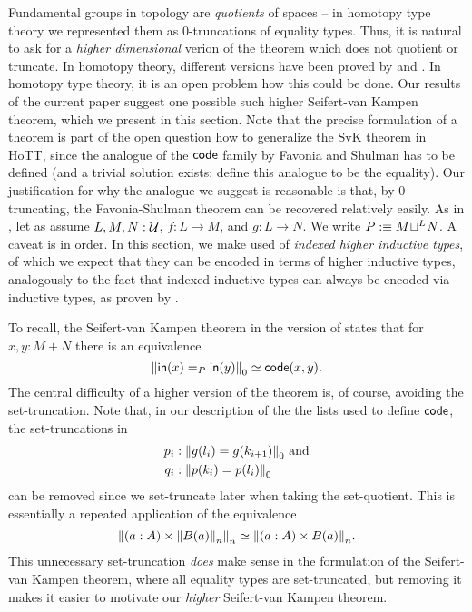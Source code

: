 Fundamental groups in topology are \emph{quotients} of spaces --
in homotopy type theory we represented them as 0-truncations of equality types.
Thus, it is natural to ask for a \emph{higher dimensional} verion of the theorem
which does not quotient or truncate.
In homotopy theory, different versions have been proved by \cite{lurie18derived}
and \cite{brown2011nonabelian}.
In homotopy type theory, it is an open problem how this could be done.
Our results of the current paper suggest one possible such higher Seifert-van Kampen theorem,
which we present in this section.
Note that the precise formulation of a theorem is part of the open question how
to generalize the SvK theorem in HoTT,
since the analogue of the $\code$ family by Favonia and Shulman has to be defined
(and a trivial solution exists: define this analogue to be the equality).
Our justification for why the analogue we suggest is reasonable is that, by
$0$-truncating, the Favonia-Shulman theorem can be recovered relatively easily.
As in , let as assume $L, M, N : \UU$,
$f : L \to M$, and $g : L \to N$. We write $P :\equiv \pout{L}{M}{N}$.
A caveat is in order.
In this section, we make used of \emph{indexed higher inductive types},
of which we expect that they can be encoded in terms of higher inductive types,
analogously to the fact that indexed inductive types can always be encoded via
inductive types, as proven by \cite{DBLP:journals/jfp/AltenkirchGHMM15,Sattler:indexedW}.

To recall, the Seifert-van Kampen theorem in the version of
\cite{favonia:SvK} states that for $x, y : M + N$ there is an equivalence
\begin{equation*}
\trunc{0}{\inp(x) =_P \inp(y)} \simeq \code(x,y) \text{.}
\end{equation*}
The central difficulty of a higher version of the theorem is, of course,
avoiding the set-truncation.
Note that, in our description of the the lists used to define $\code$,
the set-truncations in 
\begin{align*}
p_i &: \trunc 0 {g(l_i) = g(k_{i+1})} \text{ and} \\
q_i &: \trunc 0 {p(k_i) = p(l_i)}
\end{align*}
can be removed since we set-truncate later
when taking the set-quotient.
This is essentially a repeated application of the equivalence
\begin{equation*}
 \trunc{n}{(a:A) \times \trunc{n}{B(a)}} \simeq \trunc{n}{(a:A) \times B(a)}.
\end{equation*}
This unnecessary set-truncation \emph{does} make sense in the formulation of the
Seifert-van Kampen theorem, where all equality types are set-truncated, but
removing it makes it easier to motivate our \emph{higher} Seifert-van Kampen theorem.

